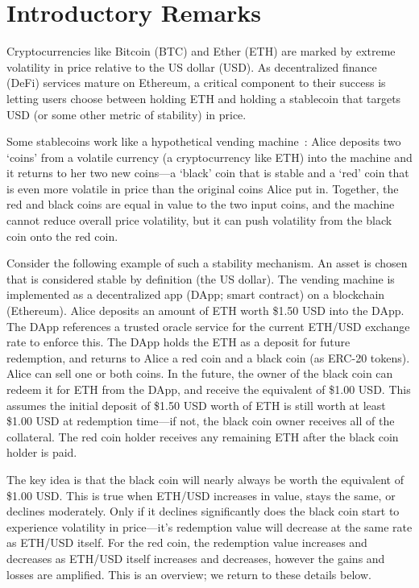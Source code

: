 

\section{Introductory Remarks}

Cryptocurrencies like Bitcoin (BTC) and Ether (ETH) are marked by extreme volatility in price relative to the US dollar (USD). As decentralized finance (DeFi) services mature on Ethereum, a critical component to their success is letting users choose between holding ETH and holding a stablecoin that targets USD (or some other metric of stability) in price.

Some stablecoins work like a hypothetical vending machine~\cite{CDM20}: Alice deposits two `coins' from a volatile currency (\eg a cryptocurrency like ETH) into the machine and it returns to her two new coins---a `black' coin that is stable and a `red' coin that is even more volatile in price than the original coins Alice put in. Together, the red and black coins are equal in value to the two input coins, and the machine cannot reduce overall price volatility, but it can push volatility from the black coin onto the red coin. 

Consider the following example of such a stability mechanism. An asset is chosen that is considered stable by definition (\eg the US dollar). The vending machine is implemented as a decentralized app (DApp; \aka smart contract) on a blockchain (\eg Ethereum). Alice deposits an amount of ETH worth \$1.50 USD into the DApp. The DApp references a trusted oracle service for the current ETH/USD exchange rate to enforce this. The DApp holds the ETH as a deposit for future redemption, and returns to Alice a red coin and a black coin (\eg as ERC-20 tokens). Alice can sell one or both coins. In the future, the owner of the black coin can redeem it for ETH from the DApp, and receive the equivalent of \$1.00 USD. This assumes the initial deposit of \$1.50 USD worth of ETH is still worth at least \$1.00 USD at redemption time---if not, the black coin owner receives all of the collateral. The red coin holder receives any remaining ETH after the black coin holder is paid.

The key idea is that the black coin will nearly always be worth the equivalent of \$1.00 USD. This is true when ETH/USD increases in value, stays the same, or declines moderately. Only if it declines significantly does the black coin start to experience volatility in price---it's redemption value will decrease at the same rate as ETH/USD itself. For the red coin, the redemption value increases and decreases as ETH/USD itself increases and decreases, however the gains and losses are amplified. This is an overview; we return to these details below.

